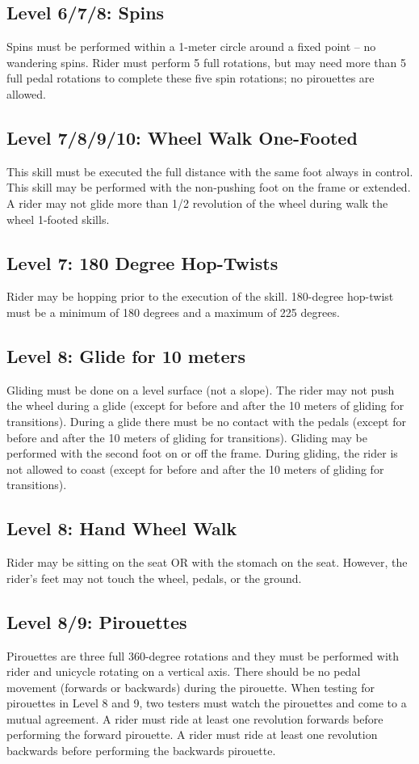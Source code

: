 \subsection{Level 6/7/8: Spins}
Spins must be performed within a 1-meter circle around a fixed point – no wandering spins. Rider must perform 5 full
rotations, but may need more than 5 full pedal rotations to complete these five spin rotations; no pirouettes are allowed.

\subsection{Level 7/8/9/10: Wheel Walk One-Footed}
This skill must be executed the full distance with the same foot always in control. This skill may be performed with the
non-pushing foot on the frame or extended. A rider may not glide more than 1/2 revolution of the wheel during walk the
wheel 1-footed skills.

\subsection{Level 7: 180 Degree Hop-Twists}
Rider may be hopping prior to the execution of the skill. 180-degree hop-twist must be a minimum of 180 degrees and
a maximum of 225 degrees.

\subsection{Level 8: Glide for 10 meters}
Gliding must be done on a level surface (not a slope). The rider may not push the wheel during a glide (except for
before and after the 10 meters of gliding for transitions). During a glide there must be no contact with the pedals
(except for before and after the 10 meters of gliding for transitions). Gliding may be performed with the second foot on
or off the frame. During gliding, the rider is not allowed to coast (except for before and after the 10 meters of gliding
for transitions).

\subsection{Level 8: Hand Wheel Walk}
Rider may be sitting on the seat OR with the stomach on the seat. However, the rider's feet may not touch the wheel,
pedals, or the ground.

\subsection{Level 8/9: Pirouettes}
Pirouettes are three full 360-degree rotations and they must be performed with rider and unicycle rotating on a vertical
axis. There should be no pedal movement (forwards or backwards) during the pirouette. When testing for pirouettes in
Level 8 and 9, two testers must watch the pirouettes and come to a mutual agreement. A rider must ride at least one
revolution forwards before performing the forward pirouette. A rider must ride at least one revolution backwards
before performing the backwards pirouette.

